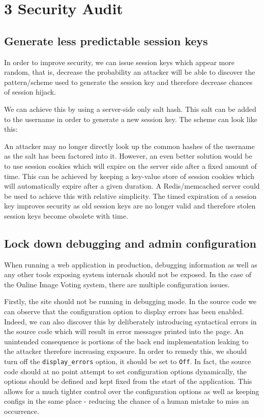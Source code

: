 \documentclass[a4paper, 12pt]{article}
\begin{document}
\section*{3 Security Audit}
\subsection*{Generate less predictable session keys}
In order to improve security, we can issue session keys which appear more random, that is, decrease the probability an attacker will be able to discover the pattern/scheme used to generate the session key and therefore decrease chances of session hijack.

We can achieve this by using a server-side only salt hash. This salt can be added to the username in order to generate a new session key. The scheme can look like this:


An attacker may no longer directly look up the common hashes of the username as the salt has been factored into it. However, an even better solution would be to use session cookies which will expire on the server side after a fixed amount of time. This can be achieved by keeping a key-value store of session cookies which will automatically expire after a given duration. A Redis/memcached server could be used to achieve this with relative simplicity. The timed expiration of a session key improves security as old session keys are no longer valid and therefore stolen session keys become obsolete with time.

\subsection*{Lock down debugging and admin configuration}
When running a web application in production, debugging information as well as any other tools exposing system internals should not be exposed. In the case of the Online Image Voting system, there are multiple configuration issues.

Firstly, the site should not be running in debugging mode. In the source code we can observe that the configuration option to display errors has been enabled. Indeed, we can also discover this by deliberately introducing syntactical errors in the source code which will result in error messages printed into the page. An unintended consequence is portions of the back end implementation leaking to the attacker therefore increasing exposure. In order to remedy this, we should turn off the \texttt{display\_errors} option, it should be set to \texttt{Off}. In fact, the source code should at no point attempt to set configuration options dynamically, the options should be defined and kept fixed from the start of the application. This allows for a much tighter control over the configuration options as well as keeping configs in the same place - reducing the chance of a human mistake to miss an occurrence.
\end{document}

